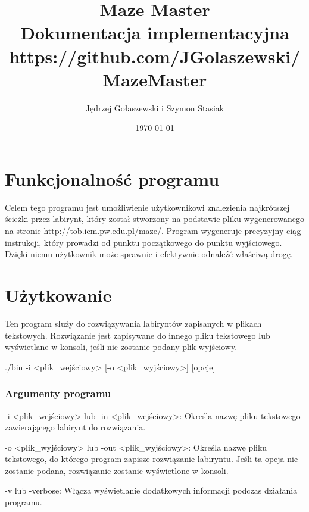 \documentclass[
]{article}
\title {Maze Master \\[1ex] \large Dokumentacja implementacyjna \\[1ex] https://github.com/JGolaszewski/MazeMaster}
\date{\today}
\author{Jędrzej Gołaszewski i Szymon Stasiak}
\begin{document}
\maketitle
\newpage
{}

\hypertarget{funkcjonalnoux15bux107-programu}{%
\section{\texorpdfstring{Funkcjonalność programu
}{Funkcjonalność programu }}\label{funkcjonalnoux15bux107-programu}}

Celem tego programu jest umożliwienie użytkownikowi znalezienia
najkrótszej ścieżki przez labirynt, który został stworzony na podstawie
pliku wygenerowanego na stronie http://tob.iem.pw.edu.pl/maze/. Program
wygeneruje precyzyjny ciąg instrukcji, który prowadzi od punktu
początkowego do punktu wyjściowego. Dzięki niemu użytkownik może
sprawnie i efektywnie odnaleźć właściwą drogę.

\hypertarget{uux17cytkowanie}{%
\section{Użytkowanie}\label{uux17cytkowanie}}

Ten program służy do rozwiązywania labiryntów zapisanych w plikach
tekstowych. Rozwiązanie jest zapisywane do innego pliku tekstowego lub
wyświetlane w konsoli, jeśli nie zostanie podany plik wyjściowy.

./bin -i \textless plik\_wejściowy\textgreater{} {[}-o
\textless plik\_wyjściowy\textgreater{]} {[}opcje{]}

\hypertarget{argumenty-programu}{%
\subsubsection{Argumenty programu}\label{argumenty-programu}}

-i \textless plik\_wejściowy\textgreater{} lub -in
\textless plik\_wejściowy\textgreater: Określa nazwę pliku tekstowego
zawierającego labirynt do rozwiązania.

-o \textless plik\_wyjściowy\textgreater{} lub -out
\textless plik\_wyjściowy\textgreater: Określa nazwę pliku tekstowego,
do którego program zapisze rozwiązanie labiryntu. Jeśli ta opcja nie
zostanie podana, rozwiązanie zostanie wyświetlone w konsoli.

-v lub -verbose: Włącza wyświetlanie dodatkowych informacji podczas
działania programu.
\end{document}
